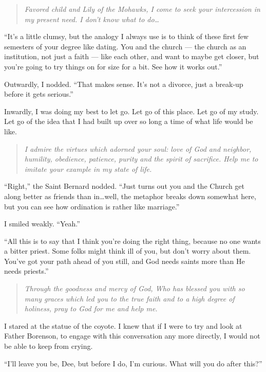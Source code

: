 \begin{quote}
\emph{Favored child and Lily of the Mohawks, I come to seek your intercession in my present need. I don't know what to do\ldots{}}
\end{quote}

``It's a little clumsy, but the analogy I always use is to think of these first few semesters of your degree like dating. You and the church --- the church as an institution, not just a faith --- like each other, and want to maybe get closer, but you're going to try things on for size for a bit. See how it works out.''

Outwardly, I nodded. ``That makes sense. It's not a divorce, just a break-up before it gets serious.''

Inwardly, I was doing my best to let go. Let go of this place. Let go of my study. Let go of the idea that I had built up over so long a time of what life would be like.

\begin{quote}
\emph{I admire the virtues which adorned your soul: love of God and neighbor, humility, obedience, patience, purity and the spirit of sacrifice. Help me to imitate your example in my state of life.}
\end{quote}

``Right,'' the Saint Bernard nodded. ``Just turns out you and the Church get along better as friends than in\ldots well, the metaphor breaks down somewhat here, but you can see how ordination is rather like marriage.''

I smiled weakly. ``Yeah.''

``All this is to say that I think you're doing the right thing, because no one wants a bitter priest. Some folks might think ill of you, but don't worry about them. You've got your path ahead of you still, and God needs saints more than He needs priests.''

\begin{quote}
\emph{Through the goodness and mercy of God, Who has blessed you with so many graces which led you to the true faith and to a high degree of holiness, pray to God for me and help me.}
\end{quote}

I stared at the statue of the coyote. I knew that if I were to try and look at Father Borenson, to engage with this conversation any more directly, I would not be able to keep from crying.

``I'll leave you be, Dee, but before I do, I'm curious. What will you do after this?''

